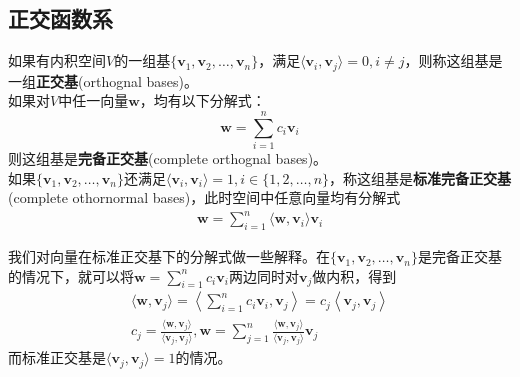 \subsection{正交函数系}\label{sub:orthognal}
\begin{definition}[正交基]
    如果有内积空间$V$的一组基$\{\mathbf{v}_1,\mathbf{v}_2,\dots ,\mathbf{v}_n\}$，满足$\langle \mathbf{v}_i,\mathbf{v}_j\rangle =0,i \neq j$，则称这组基是一组\textbf{正交基}(orthognal bases)。\\如果对$V$中任一向量$\mathbf{w}$，均有以下分解式：
    \[\mathbf{w}=\sum_{i = 1}^{n}  c_i \mathbf{v}_i\]
则这组基是\textbf{完备正交基}(complete orthognal bases)。\\
如果$\{\mathbf{v}_1,\mathbf{v}_2,\dots ,\mathbf{v}_n\}$还满足$\langle \mathbf{v}_i,\mathbf{v}_i\rangle =1,i\in \{1,2,\dots ,n\}$，称这组基是\textbf{标准完备正交基} (complete othornormal bases)，此时空间中任意向量均有分解式
\begin{align*}
    \mathbf{w}=\sum_{i=1}^{n}\langle \mathbf{w},\mathbf{v}_i\rangle \mathbf{v}_i
\end{align*}
\end{definition}
我们对向量在标准正交基下的分解式做一些解释。在$\{\mathbf{v}_1,\mathbf{v}_2,\dots ,\mathbf{v}_n\}$是完备正交基的情况下，就可以将$\mathbf{w}=\sum_{i = 1}^{n}  c_i \mathbf{v}_i$两边同时对$\mathbf{v}_j$做内积，得到
\begin{align*}
    \langle \mathbf{w},\mathbf{v}_j \rangle=\left\langle \sum_{i = 1}^{n}  c_i \mathbf{v}_i,\mathbf{v}_j \right\rangle =c_j\left\langle \mathbf{v}_j,\mathbf{v}_j \right\rangle \\
    c_j=\frac{\langle \mathbf{w},\mathbf{v}_j \rangle}{\langle \mathbf{v}_j,\mathbf{v}_j \rangle},
    \mathbf{w}=\sum_{j = 1}^{n}  \frac{\langle \mathbf{w},\mathbf{v}_j \rangle}{\langle \mathbf{v}_j,\mathbf{v}_j \rangle} \mathbf{v}_j
\end{align*}
而标准正交基是$\langle \mathbf{v}_j,\mathbf{v}_j \rangle=1$的情况。

